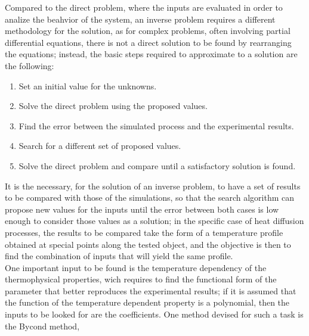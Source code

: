 Compared to the direct problem, where the inputs are evaluated in order to analize the beahvior of the system, an inverse problem requires a different methodology for the solution, as for complex problems, often involving partial differential equations, there is not a direct solution to be found by rearranging the equations; instead, the basic steps required to approximate to a solution are the following:

\begin{enumerate}
	\item Set an initial value for the unknowns.
	\item Solve the direct problem using the proposed values.
	\item Find the error between the simulated process and the experimental results.
	\item Search for a different set of proposed values.
	\item Solve the direct problem and compare until a satisfactory solution is found.
\end{enumerate}

It is the necessary, for the solution of an inverse problem, to have a set of results to be compared with those of the simulations, so that the search algorithm can propose new values for the inputs until the error between both cases is low enough to consider those values as a solution; in the specific case of heat diffusion processes, the results to be compared take the form of a temperature profile obtained at special points along the tested object, and the objective is then to find the combination of inputs that will yield the same profile.\\

One important input to be found is the temperature dependency of the thermophysical properties, wich requires to find the functional form of the parameter that better reproduces the experimental results; if it is assumed that the function of the temperature dependent property is a polynomial, then the inputs to be looked for are the coefficients. One method devised for such a task is the Bycond method, 